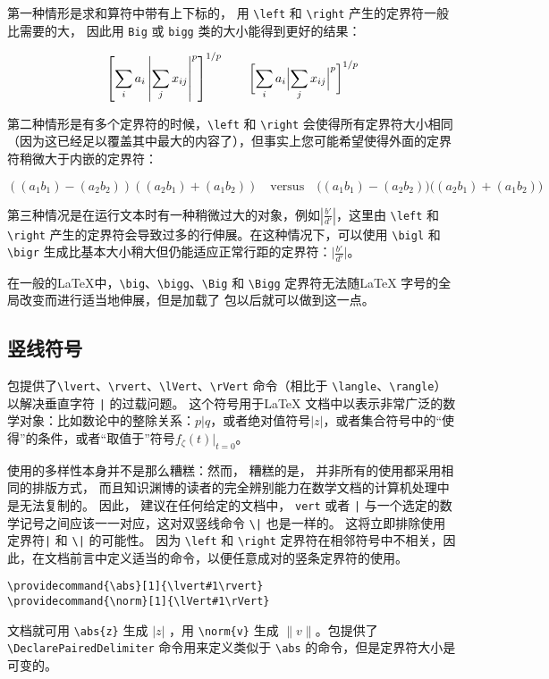 第一种情形是求和算符中带有上下标的，  用 \verb|\left| 和 \verb|\right| 产生的定界符一般比需要的大，  因此用 \verb|Big| 或 \verb|bigg| 类的大小能得到更好的结果：
\begin{tcblisting}{}
\[\left[\sum_i a_i\left\lvert\sum_j x_{ij}\right\rvert^p\right]^{1/p}\qquad\biggl[\sum_i a_i\Bigl\lvert\sum_j x_{ij}\Bigr\rvert^p\biggr]^{1/p}\]
\end{tcblisting}

第二种情形是有多个定界符的时候，\verb|\left| 和 \verb|\right| 会使得所有定界符大小相同（因为这已经足以覆盖其中最大的内容了），但事实上您可能希望使得外面的定界符稍微大于内嵌的定界符：
\begin{tcblisting}{}
\[\left((a_1 b_1)-(a_2 b_2)\right)
\left((a_2 b_1)+(a_1 b_2)\right)
\quad\text{versus}\quad
\bigl((a_1 b_1)-(a_2 b_2)\bigr)
\bigl((a_2 b_1)+(a_1 b_2)\bigr)\]
\end{tcblisting}

第三种情况是在运行文本时有一种稍微过大的对象，例如$\left|\frac{b'}{d'}\right|$，这里由 \verb|\left| 和 \verb|\right| 产生的定界符会导致过多的行伸展。在这种情况下，可以使用 \verb|\bigl| 和 \verb|\bigr| 生成比基本大小稍大但仍能适应正常行距的定界符：$\bigl|\frac{b'}{d'}\bigr|$。

在一般的\LaTeX 中，\verb|\big|、\verb|\bigg|、\verb|\Big| 和 \verb|\Bigg| 定界符无法随\LaTeX{} 字号的全局改变而进行适当地伸展，但是加载了  包以后就可以做到这一点。
\subsection{竖线符号}
包提供了\verb|\lvert|、\verb|\rvert|、\verb|\lVert|、\verb|\rVert| 命令（相比于 \verb|\langle|、\verb|\rangle|）以解决垂直字符 \verb+|+ 的过载问题。 这个符号用于\LaTeX{} 文档中以表示非常广泛的数学对象：比如数论中的整除关系：$p|q$，或者绝对值符号$|z|$，或者集合符号中的“使得”的条件，或者“取值于”符号$f_\zeta(t)\big|_{t=0}$。

使用的多样性本身并不是那么糟糕：然而，  糟糕的是，  并非所有的使用都采用相同的排版方式，  而且知识渊博的读者的完全辨别能力在数学文档的计算机处理中是无法复制的。 因此，  建议在任何给定的文档中，  \verb|vert| 或者 \verb+|+ 与一个选定的数学记号之间应该一一对应，这对双竖线命令 \verb+\|+ 也是一样的。 这将立即排除使用定界符\verb+|+ 和 \verb+\|+ 的可能性。 因为 \verb|\left| 和 \verb|\right| 定界符在相邻符号中不相关，因此，在文档前言中定义适当的命令，以便任意成对的竖条定界符的使用。
\begin{verbatim}
\providecommand{\abs}[1]{\lvert#1\rvert}
\providecommand{\norm}[1]{\lVert#1\rVert}
\end{verbatim}
文档就可用 \verb|\abs{z}| 生成 $|z|$ ，用 \verb|\norm{v}| 生成 $\|v\|$。包提供了 \verb|\DeclarePairedDelimiter| 命令用来定义类似于 \verb|\abs| 的命令，但是定界符大小是可变的。